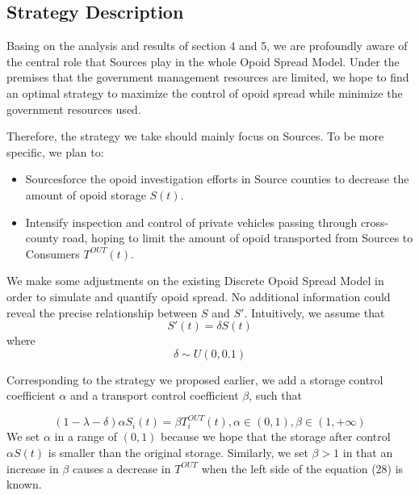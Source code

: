\subsection{Strategy Description}
Basing on the analysis and results of section 4 and 5, we are profoundly aware of the central role that Sources play in the whole Opoid Spread Model. Under the premises that the government management resources are limited, we hope to find an optimal strategy to maximize the control of opoid spread while minimize the government resources used. 

Therefore, the strategy we take should mainly focus on Sources. To be more specific, we plan to:
\begin{itemize}
	\item Sourcesforce the opoid investigation efforts in Source counties to decrease the amount of opoid storage $S(t)$.
	\item Intensify inspection and control of private vehicles passing through cross-county road, hoping to limit the amount of opoid transported from Sources to Consumers $T^{OUT}(t)$.
\end{itemize}

We make some adjustments on the existing Discrete Opoid Spread Model in order to simulate and quantify opoid spread. No additional information could reveal the precise relationship between  $S$ and $S'$. Intuitively, we assume that 
\begin{equation}
S'(t) = \delta S(t)
\end{equation}
where
\begin{equation}
\delta \sim U(0, 0.1)
\end{equation}

Corresponding to the strategy we proposed earlier, we add a storage control coefficient $\alpha$ and a transport control coefficient $\beta$, such that
\begin{comment}
\begin{equation}
\alpha S_i(t) - S_i'(t) = \lambda S_i(t) + \beta T_i^{OUT}(t), \alpha\in (0,1), \beta \in (1, +\infty)
\end{equation}
Combining (23-25), we have
\end{comment}
\begin{equation}
(1 - \lambda - \delta)\alpha S_i(t) = \beta T_i^{OUT}(t), \alpha\in (0,1), \beta \in (1, +\infty)
\end{equation}
We set $\alpha$ in a range of $(0,1)$ because we hope that the storage after control $\alpha S(t)$ is smaller than the original storage. Similarly, we set $\beta > 1$ in that an increase in $\beta$ causes a decrease in $T^{OUT}$ when the left side of the equation (28) is known.

